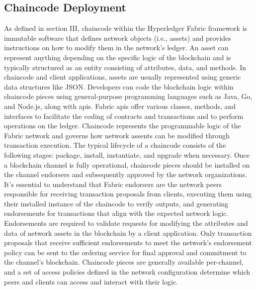 \documentclass[conference]{IEEEtran}
\begin{document}
\subsection{Chaincode Deployment}
As defined in section III, chaincode within the Hyperledger Fabric framework is immutable software that defines network objects (i.e., assets) and provides instructions on how to modify them in the network's ledger. An asset can represent anything depending on the specific logic of the blockchain and is typically structured as an entity consisting of attributes, data, and methods. In chaincode and client applications, assets are usually represented using generic data structures like JSON. Developers can code the blockchain logic within chaincode pieces using general-purpose programming languages such as Java, Go, and Node.js, along with \ac{api}s. Fabric \ac{api}s offer various classes, methods, and interfaces to facilitate the coding of contracts and transactions and to perform operations on the ledger. Chaincode represents the programmable logic of the Fabric network and governs how network assents can be modified through transaction execution. The typical lifecycle of a chaincode consists of the following stages: package, install, instantiate, and upgrade when necessary. Once a blockchain channel is fully operational, chaincode pieces should be installed on the channel endorsers and subsequently approved by the network organizations. It's essential to understand that Fabric endorsers are the network peers responsible for receiving transaction proposals from clients, executing them using their installed instance of the chaincode to verify outputs, and generating endorsements for transactions that align with the expected network logic. Endorsements are required to validate requests for modifying the attributes and data of network assets in the blockchain by a client application. Only transaction proposals that receive sufficient endorsements to meet the network's endorsement policy can be sent to the ordering service for final approval and commitment to the channel's blockchain. Chaincode pieces are generally available per-channel, and a set of access policies defined in the network configuration determine which peers and clients can access and interact with their logic. \\
\end{document}
